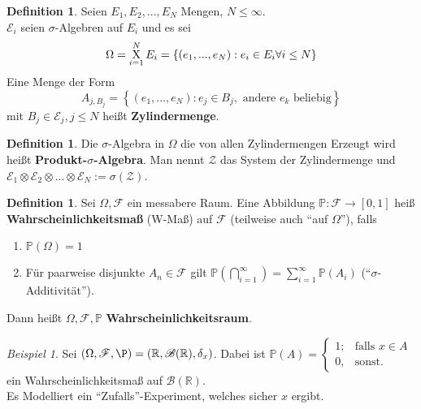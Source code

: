 \documentclass[10pt,a4paper]{article}
\newcommand{\R}{\ensuremath{\mathbb{R}}}
\newcommand{\Bor}{\mathscr B}
\newcommand{\Prb}{\mathbb P}
\newcommand{\scF}{\ensuremath{\mathscr{F}}}
\theoremstyle{plain}
\theoremstyle{definition}
\newtheorem{definition}[theorem]{Definition}
\theoremstyle{remark}
\newtheorem{exm}[theorem]{Beispiel}
\begin{document}
	\begin{definition}
		Seien $E_1,E_2,...,E_N$ Mengen, $N\leq \infty$.\\
		$\mathscr E_i$ seien $\sigma$-Algebren auf $E_i$ und es sei
		\[\Omega=\operatornamewithlimits{X}_{i=1}^NE_i=\left\{(e_1,...,e_N):e_i\in E_i\forall i\leq N\right\}\]
		Eine Menge der Form
		\[A_{j,B_j}=\left\{(e_1,...,e_N):e_j\in B_j,\text{ andere $e_k$ beliebig}\right\}\]
		mit $B_j\in\mathscr E_j,j\leq N$ heißt \textbf{Zylindermenge}.\\
	\end{definition}
	\addtocounter{theorem}{-1}
	\begin{definition}
		Die $\sigma$-Algebra in $\Omega$ die von allen Zylindermengen Erzeugt wird heißt \textbf{Produkt-$\sigma$-Algebra}.
		Man nennt $\mathscr Z$ das System der Zylindermenge und $\mathscr E_1\otimes\mathscr E_2\otimes...\otimes \mathscr E_N:=\sigma(\mathscr Z)$.
	\end{definition}

	\begin{definition}
		Sei $\Omega,\scF$ ein messabere Raum. Eine Abbildung $\Prb:\scF\to [0,1]$ heiß \textbf{Wahrscheinlichkeitsmaß} (W-Maß) auf $\scF$ (teilweise auch \enquote{auf $\Omega$}), falls
		\begin{enumerate}[label=\alph*)]
			\item $\Prb(\Omega)=1$
			\item Für paarweise disjunkte $A_n\in\scF$ gilt $\Prb(\bigcap_{i=1}^\infty)=\sum_{i=1}^\infty \Prb(A_i)$ (\enquote{$\sigma$-Additivität}).
		\end{enumerate}
	Dann heißt $\Omega,\scF,\Prb$ \textbf{Wahrscheinlichkeitsraum}.
	\end{definition}

	\begin{exm}
		Sei $(\Omega,\scF,\P)=(\R,\Bor(\R),\delta_x)$. Dabei ist $\Prb(A)=\begin{cases}
		1;&\text{falls $x\in A$}\\0,&\text{sonst}.
		\end{cases}$ ein Wahrscheinlichkeitsmaß auf $\Bor(\R)$. \\
		Es Modelliert ein \enquote{Zufalls}-Experiment, welches sicher $x$ ergibt.
	\end{exm}
\end{document}
